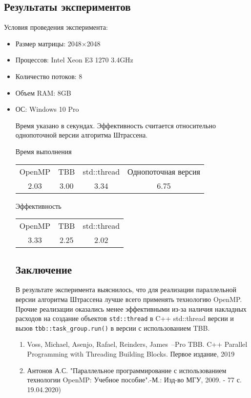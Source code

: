 \documentclass{report}
\begin{document}
\begin{center}
\section{Результаты экспериментов}
\par Условия проведения эксперимента:
\begin{itemize}[label={}]
\item Размер матрицы: 2048$\times$2048
\item Процессов: Intel Xeon E3 1270 3.4GHz
\item Количество потоков: 8
\item Объем RAM: 8GB
\item ОС: Windows 10 Pro
\par Время указано в секундах. Эффективность считается относительно однопоточной версии алгоритма Штрассена.
\begin{center}
Время выполнения
\begin{tabular}{|c|c|c|c|}
OpenMP & TBB & std::thread & Однопоточная версия \\
2.03 & 3.00 & 3.34 & 6.75
\end{tabular}
Эффективность
\begin{tabular}{|c|c|c|}
OpenMP & TBB & std::thread \\
3.33 & 2.25 & 2.02
\end{tabular}
\end{center}


\section{Заключение}
\par В результате эксперимента выяснилось, что для реализации параллельной версии алгоритма Штрассена лучше всего применять технологию OpenMP. Прочие реализации оказались менее эффективными из-за наличия накладных расходов на создание объектов \lstinline{std::thread} в C++ std::thread версии и вызов \lstinline{tbb::task_group.run()} в версии с использованием TBB.




\begin{enumerate}
\item Voss, Michael, Asenjo, Rafael, Reinders, James~--Pro TBB. C++ Parallel Programming with Threading Building Blocks. Первое издание, 2019
\item Антонов А.С. "Параллельное программирование с использованием технологии OpenMP: Учебное пособие".-М.: Изд-во МГУ, 2009. - 77 с. 19.04.2020)
\end{enumerate}
\newpage




\end{itemize}
\end{center}
\end{document}
